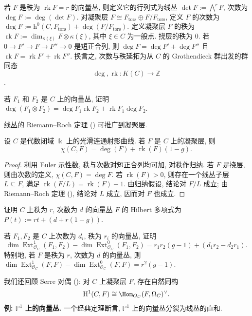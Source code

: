 若 $F$ 是秩为 $\operatorname{rk}F=r$ 的向量丛, 则定义它的行列式为线丛 $\det F:=\bigwedge^rF$, 次数为 $\deg F:=\deg(\det F)$. 对凝聚层 $F\cong F_{\mathrm{tors}}\oplus F/F_{\mathrm{tors}}$, 定义 $F$ 的次数为 $\deg F:=\mathrm h^0(C,F_{\mathrm{tors}})+\deg(F/F_{\mathrm{tors}})$. 定义凝聚层 $F$ 的秩为 $\operatorname{rk}F:=\dim_{\kappa(\xi)}F\otimes\kappa(\xi)$, 其中 $\xi\in C$ 为一般点. 挠层的秩为 $0$. 若 $0\to F'\to F\to F''\to0$ 是短正合列, 则 $\deg F=\deg F'+\deg F''$ 且 $\operatorname{rk}F=\operatorname{rk}F'+\operatorname{rk}F''$. 换言之, 次数与秩延拓为从 $C$ 的 Grothendieck 群出发的群同态
\[
\deg,\operatorname{rk}:K(C)\to\mathbb Z
\]
\cite[习题 II.6.10]{Har77}.
\begin{exercise}[简单]\label{src:9.1.1}
若 $F_1$ 和 $F_2$ 是 $C$ 上的向量丛, 证明 $\deg(F_1\otimes F_2)=\deg F_1\operatorname{rk}F_2+\operatorname{rk}F_1\deg F_2$.
\end{exercise}
线丛的 Riemann--Roch 定理 () 可推广到凝聚层.
\begin{theorem}\label{src:9.1.2}
设 $C$ 是代数闭域 $\Bbbk$ 上的光滑连通射影曲线. 若 $F$ 是 $C$ 上的凝聚层, 则
\[
\chi(C,F)=\deg(F)+\operatorname{rk}(F)(1-g).
\]
\end{theorem}
\begin{proof}
利用 Euler 示性数, 秩与次数对短正合列均可加, 对秩作归纳. 若 $F$ 是挠层, 则由次数的定义, $\chi(C,F)=\deg F$. 若 $\operatorname{rk}(F)>0$, 则存在一个线丛子层 $L\subseteq F$, 满足 $\operatorname{rk}(F/L)=\operatorname{rk}(F)-1$. 由归纳假设, 结论对 $F/L$ 成立; 由 Riemann--Roch 定理 (), 结论对 $L$ 成立, 因而对 $F$ 也成立.
\end{proof}
\begin{exercise}[简单]\label{src:9.1.3}
证明 $C$ 上秩为 $r$, 次数为 $d$ 的向量丛 $F$ 的 Hilbert 多项式为 $P(t):=rt+(d+r(1-g))$.
\end{exercise}
\begin{exercise}[简单]\label{src:9.1.4}
若 $F_1,F_2$ 是 $C$ 上次数为 $d_i$, 秩为 $r_i$ 的向量丛, 证明
\[
\dim\operatorname{Ext}_{\mathcal O_C}^1(F_1,F_2)-\dim\operatorname{Ext}_{\mathcal O_C}^0(F_1,F_2)
=r_1r_2(g-1)+(d_1r_2-d_2r_1).
\]
特别地, 若 $F$ 是秩为 $r$, 次数为 $d$ 的向量丛, 则 $\dim\operatorname{Ext}_{\mathcal O_C}^1(F,F)-\dim\operatorname{Ext}_{\mathcal O_C}^0(F,F)=r^2(g-1)$.
\end{exercise}
我们还回顾 Serre 对偶 (): 对 $C$ 上凝聚层 $F$, 存在自然同构
\[
\mathrm H^1(C,F)\cong\Hom_{\mathcal O_C}(F,\Omega_C)^\vee.
\]
\textbf{例: $\mathbb P^1$ 上的向量丛.} 一个经典定理断言, $\mathbb P^1$ 上的向量丛分裂为线丛的直和.
